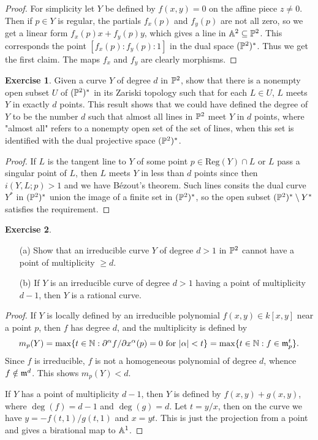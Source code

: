 \documentclass[11pt]{book}
\theoremstyle{definition}
\newtheorem{exercise}{Exercise}[section]
\begin{document}
\begin{proof}
For simplicity let $Y$ be defined by $f(x,y)=0$ on the affine piece $z\neq 0 $. Then if $p\in Y$ is regular, the partials $f_x(p)$ and $f_y(p)$ are not all zero, so we get a linear form $f_x(p)x+f_y(p)y$, which gives a line in $\A^2\sub\P^2$. This corresponds the point $[f_x(p):f_y(p):1]$ in the dual space $(\P^2)^*$. Thus we get the first claim. The maps $f_x$ and $f_y$ are clearly morphisms.
\end{proof}
\begin{exercise}
Given a curve $Y$ of degree $d$ in $\P^2$, show that there is a nonempty open subset $U$ of $(\P^2)^*$ in its Zariski topology such that for each $L\in U$, $L$ meets $Y$ in exactly $d$ points. This result shows that we could have defined the degree of $Y$ to be the number $d$ such that almost all lines in $\P^2$ meet $Y$ in $d$ points, where "almost all" refers to a nonempty open set of the set of lines, when this set is identified with the dual projective space $(\P^2)^*$.
\end{exercise}
\begin{proof}
If $L$ is the tangent line to $Y$ of some point $p\in\mathrm{Reg}(Y)\cap L$ or $L$ pass a singular point of $L$, then $L$ meets $Y$ in less than $d$ points since then $i(Y,L;p)>1$ and we have B\'ezout's theorem. Such lines consits the dual curve $Y^*$ in $(\P^2)^*$ union the image of a finite set in $(\P^2)^*$, so the open subset $(\P^2)^*\setminus Y^*$ satisfies the requirement.
\end{proof}
\begin{exercise}
\mbox{}
\begin{itemize}
\item[(a)] Show that an irreducible curve $Y$ of degree $d>1$ in $\P^2$ cannot have a point of multiplicity $\geq d$.
\item[(b)] If $Y$ is an irreducible curve of degree $d>1$ having a point of multiplicity $d-1$, then $Y$ is a rational curve. 
\end{itemize}
\end{exercise}
\begin{proof}
If $Y$ is locally defined by an irreducible polynomial $f(x,y)\in k[x,y]$ near a point $p$, then $f$ has degree $d$, and the multiplicity is defined by
\[m_p(Y)=\max\{t\in\N:\text{$\partial^\alpha f/\partial x^\alpha(p)=0$ for $|\alpha|<t$}\}=\max\{t\in\N:f\in\m_p^t\}.\]
Since $f$ is irreducible, $f$ is not a homogeneous polynomial of degree $d$, whence $f\notin\m^d$. This shows $m_p(Y)<d$.\par
If $Y$ has a point of multiplicity $d-1$, then $Y$ is defined by $f(x,y)+g(x,y)$, where $\deg(f)=d-1$ and $\deg(g)=d$. Let $t=y/x$, then on the curve we have $y=-f(t,1)/g(t,1)$ and $x=yt$. This is just the projection from a point and gives a birational map to $\A^1$.
\end{proof}
\end{document}
